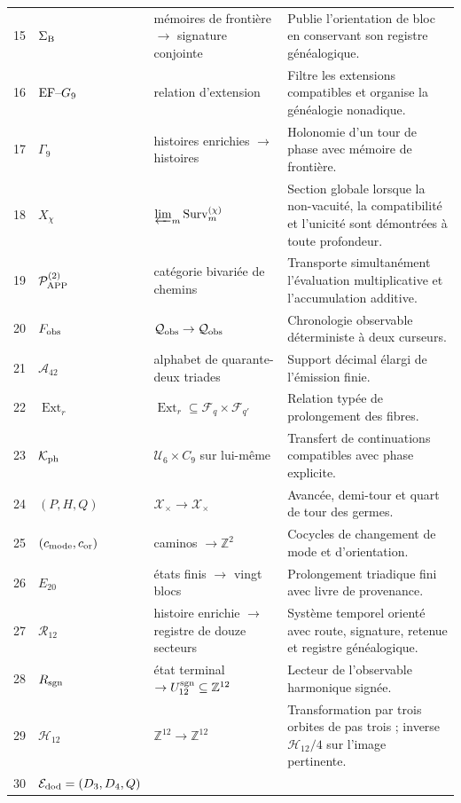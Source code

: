 {\begin{longtable}{@{}r p{}p{}p{}@{}}
15&\(\Sigma_{\rm B}\)&mémoires de frontière \(\to\) signature conjointe&
Publie l’orientation de bloc en conservant son registre généalogique.\\
16&\({\rm EF}\text{--}G_9\)&relation d’extension&
Filtre les extensions compatibles et organise la généalogie nonadique.\\
17&\(\Gamma_9\)&histoires enrichies \(\longrightarrow\) histoires&
Holonomie d’un tour de phase avec mémoire de frontière.\\
18&\(X_\chi\)&\(\varprojlim_m\operatorname{Surv}^{(\chi)}_m\)&
Section globale lorsque la non-vacuité, la compatibilité et l’unicité sont
démontrées à toute profondeur.\\
19&\(\mathcal P_{\rm APP}^{(2)}\)&catégorie bivariée de chemins&
Transporte simultanément l’évaluation multiplicative et l’accumulation
additive.\\
20&\(F_{\rm obs}\)&\(\mathcal Q_{\rm obs}\to\mathcal Q_{\rm obs}\)&
Chronologie observable déterministe à deux curseurs.\\
21&\(\mathcal A_{42}\)&alphabet de quarante-deux triades&
Support décimal élargi de l’émission finie.\\
22&\(\operatorname{Ext}_r\)&
\(\operatorname{Ext}_r\subseteq\mathcal F_q\times\mathcal F_{q'}\)&
Relation typée de prolongement des fibres.\\
23&\(\mathcal K_{\rm ph}\)&\(\mathcal U_6\times C_9\) sur lui-même&
Transfert de continuations compatibles avec phase explicite.\\
24&\((P,H,Q)\)&\(\mathcal X_\times\to\mathcal X_\times\)&
Avancée, demi-tour et quart de tour des germes.\\
25&\((c_{\rm mode},c_{\rm or})\)&caminos \(\to\mathbb Z^2\)&
Cocycles de changement de mode et d’orientation.\\
26&\(E_{20}\)&états finis \(\to\) vingt blocs&
Prolongement triadique fini avec livre de provenance.\\
27&\(\mathcal R_{12}\)&histoire enrichie \(\to\) registre de douze
secteurs&
Système temporel orienté avec route, signature, retenue et registre généalogique.\\
28&\(R_{\rm sgn}\)&état terminal \(\to U_{12}^{\rm sgn}
\subseteq\mathbb Z^{12}\)&
Lecteur de l’observable harmonique signée.\\
29&\(\mathcal H_{12}\)&\(\mathbb Z^{12}\to\mathbb Z^{12}\)&
Transformation par trois orbites de pas trois ; inverse
\(\mathcal H_{12}/4\) sur l’image pertinente.\\
30&\(\mathcal E_{\rm dod}=(D_3,D_4,Q)\)&

\end{longtable}}
